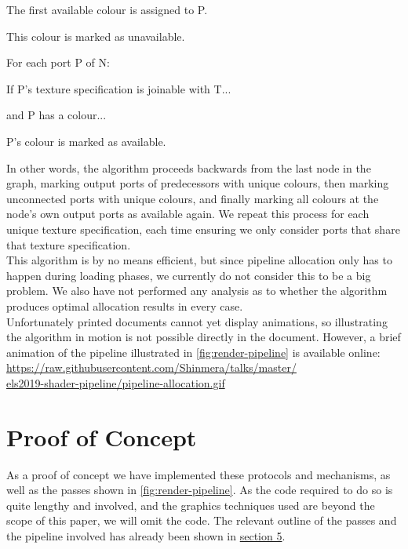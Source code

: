 \documentclass[format=sigconf]{acmart}
\begin{document}
\begin{step}
\begin{step}
\begin{step}
\begin{step}
      \item The first available colour is assigned to P.
      \item This colour is marked as unavailable.
      \end{step}
    \item For each port P of N:
      \begin{step}
      \item If P's texture specification is joinable with T...
      \item and P has a colour...
      \item P's colour is marked as available.
      \end{step}
    \end{step}
  \end{step}
\end{step}

In other words, the algorithm proceeds backwards from the last node in the graph, marking output ports of predecessors with unique colours, then marking unconnected ports with unique colours, and finally marking all colours at the node's own output ports as available again. We repeat this process for each unique texture specification, each time ensuring we only consider ports that share that texture specification. \\

This algorithm is by no means efficient, but since pipeline allocation only has to happen during loading phases, we currently do not consider this to be a big problem. We also have not performed any analysis as to whether the algorithm produces optimal allocation results in every case.\\

Unfortunately printed documents cannot yet display animations, so illustrating the algorithm in motion is not possible directly in the document. However, a brief animation of the pipeline illustrated in \autoref{fig:render-pipeline} is available online: \\

\href{https://raw.githubusercontent.com/Shinmera/talks/master/els2019-shader-pipeline/pipeline-allocation.gif}{https://raw.githubusercontent.com/Shinmera/talks/master/\\els2019-shader-pipeline/pipeline-allocation.gif}

\section{Proof of Concept}\label{concept}
As a proof of concept we have implemented these protocols and mechanisms, as well as the passes shown in \autoref{fig:render-pipeline}. As the code required to do so is quite lengthy and involved, and the graphics techniques used are beyond the scope of this paper, we will omit the code. The relevant outline of the passes and the pipeline involved has already been shown in \hyperref[pipelines]{section 5}. \\
\end{document}
